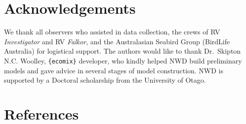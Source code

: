 \documentclass{article}
\begin{document}
\hypertarget{acknowledgements}{%
\section{Acknowledgements}\label{acknowledgements}}

We thank all observers who assisted in data collection, the crews of RV
\emph{Investigator} and RV \emph{Falkor}, and the Australasian Seabird
Group (BirdLife Australia) for logistical support. The authors would
like to thank Dr.~Skipton N.C. Woolley, \texttt{\{ecomix\}} developer,
who kindly helped NWD build preliminary models and gave advice in
several stages of model construction. NWD is supported by a Doctoral
scholarship from the University of Otago.

\hypertarget{references}{%
\section{References}\label{references}}
\end{document}
